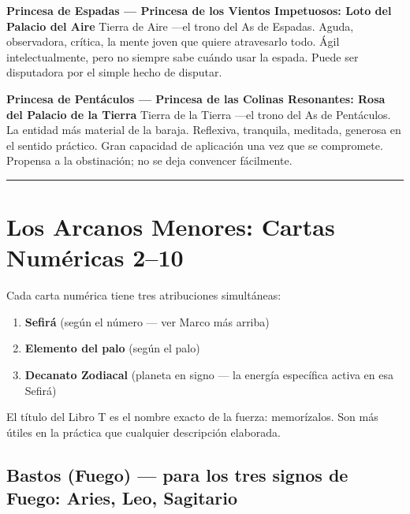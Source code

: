 \textbf{Princesa de Espadas --- Princesa de los Vientos Impetuosos: Loto del Palacio del Aire} Tierra de Aire ---el trono del As de Espadas. Aguda, observadora, crítica, la mente joven que quiere atravesarlo todo. Ágil intelectualmente, pero no siempre sabe cuándo usar la espada. Puede ser disputadora por el simple hecho de disputar.

\textbf{Princesa de Pentáculos --- Princesa de las Colinas Resonantes: Rosa del Palacio de la Tierra} Tierra de la Tierra ---el trono del As de Pentáculos. La entidad más material de la baraja. Reflexiva, tranquila, meditada, generosa en el sentido práctico. Gran capacidad de aplicación una vez que se compromete. Propensa a la obstinación; no se deja convencer fácilmente.

\begin{center}\rule{0.5\linewidth}{0.5pt}\end{center}

\section{Los Arcanos Menores: Cartas Numéricas 2--10}\label{the-minor-arcana-pip-cards-210}

Cada carta numérica tiene tres atribuciones simultáneas:

\begin{enumerate}
\def\labelenumi{\arabic{enumi}.}
\tightlist
\item
  \textbf{Sefirá} (según el número --- ver Marco más arriba)
\item
  \textbf{Elemento del palo} (según el palo)
\item
  \textbf{Decanato Zodiacal} (planeta en signo --- la energía específica activa en esa Sefirá)
\end{enumerate}

El título del Libro T es el nombre exacto de la fuerza: memorízalos. Son más útiles en la práctica que cualquier descripción elaborada.

\subsection{Bastos (Fuego) --- para los tres signos de Fuego: Aries, Leo, Sagitario}\label{wands-fire--suits-the-three-fire-signs-aries-leo-sagittarius}


